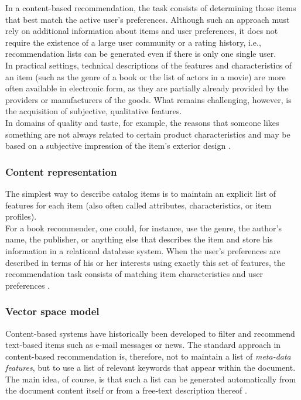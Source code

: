 In a content-based recommendation, the task consists of
determining those items that best match the active user’s preferences.
Although such an approach must rely on additional information about
items and user preferences, it does not require the existence of a
large user community or a rating history, i.e., recommendation lists
can be generated even if there is only one single user. \\In practical
settings, technical descriptions of the features and characteristics
of an item (such as the genre of a book or the list of actors in a
movie) are more often available in electronic form, as they are
partially already provided by the providers or manufacturers of the
goods. What remains challenging, however, is the acquisition of
subjective, qualitative features. \\ In domains of quality and taste,
for example, the reasons that someone likes something are not always
related to certain product characteristics and may be based on a
subjective impression of the item’s exterior design
 \cite{jannach2010recommender}.

\subsubsection{Content representation} 

The simplest way to describe catalog items is to maintain an explicit
list of features for each item (also often called attributes,
characteristics, or item profiles). \\For a book recommender, one could,
for instance, use the genre, the author’s name, the publisher, or
anything else that describes the item and store his information in a
relational database system. When the user’s preferences are described
in terms of his or her interests using exactly this set of features,
the recommendation task consists of matching item characteristics and
user preferences  \cite{jannach2010recommender}.

\subsubsection{Vector space model}  

Content-based systems have historically been developed to filter and
recommend text-based items such as e-mail messages or news.  The
standard approach in content-based recommendation is, therefore,  not
to maintain a list of \textit{meta-data features}, but to use a list
of relevant keywords that appear within the document. \\The main idea,
of course, is that such a list can be generated automatically from the
document content itself or from a free-text description thereof
\cite{jannach2010recommender}.


